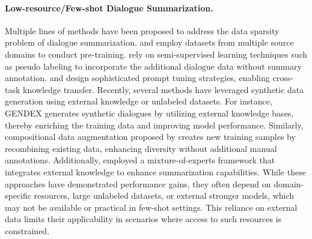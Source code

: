 \paragraph{Low-resource/Few-shot Dialogue Summarization.}
Multiple lines of methods have been proposed to address the data sparsity problem of dialogue summarization.
%
\citet{yu-etal-2021-adaptsum} and \citet{zou-etal-2021-low} employ datasets from multiple source domains to conduct pre-training.
%
\citet{he-etal-2024-semi} rely on semi-supervised learning techniques such as pseudo labeling to incorporate the additional dialogue data without summary annotation.
%
\citet{xie-etal-2024-shot} and \citet{zhao-etal-2022-domain} design sophisticated prompt tuning strategies, enabling cross-task knowledge transfer.
%
Recently, several methods have leveraged synthetic data generation using external knowledge or unlabeled datasets. For instance, GENDEX \citep{park2024gendex} generates synthetic dialogues by utilizing external knowledge bases, thereby enriching the training data and improving model performance. Similarly, compositional data augmentation proposed by \citet{ouyang2023compositional} creates new training samples by recombining existing data, enhancing diversity without additional manual annotations. Additionally, \citet{tian2024dialogue} employed a mixture-of-experts framework that integrates external knowledge to enhance summarization capabilities.
While these approaches have demonstrated performance gains, they often depend on domain-specific resources, large unlabeled datasets, or external stronger models, which may not be available or practical in few-shot settings.
This reliance on external data limits their applicability in scenarios where access to such resources is constrained. 


\iffalse
\paragraph{Self-Alignment.}
Instruction following
output response with DPO

Direct Preference Optimization (DPO) is a technique for aligning language model outputs with desired preferences using preference data directly in the optimization process. Unlike reinforcement learning approaches such as Reinforcement Learning from Human Feedback (RLHF) \citep{bai2022training}, which require a separate reward model and can be computationally intensive, DPO integrates preference data into the training objective without additional overhead. \citet{rafailov2024direct} introduced DPO to efficiently fine-tune language models according to human preferences, demonstrating improvements in generating coherent and contextually appropriate responses. This method reduces reliance on external feedback mechanisms and is suitable for scenarios with limited computational resources.
\fi

